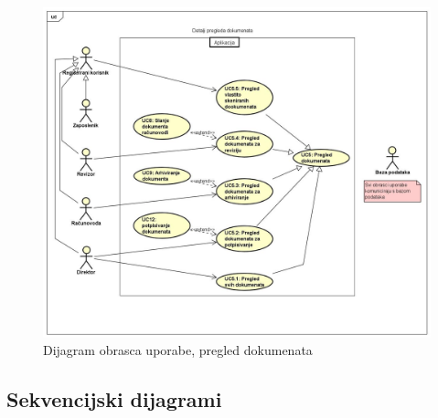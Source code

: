 				\begin{figure}[H]
					\includegraphics[scale=0.3]{slike/pregled dokumenata} %
					\centering
					\caption{ Dijagram obrasca uporabe, pregled dokumenata}
					\label{fig:promjene}
				\end{figure}
				\eject		
				
			\subsection{Sekvencijski dijagrami}


